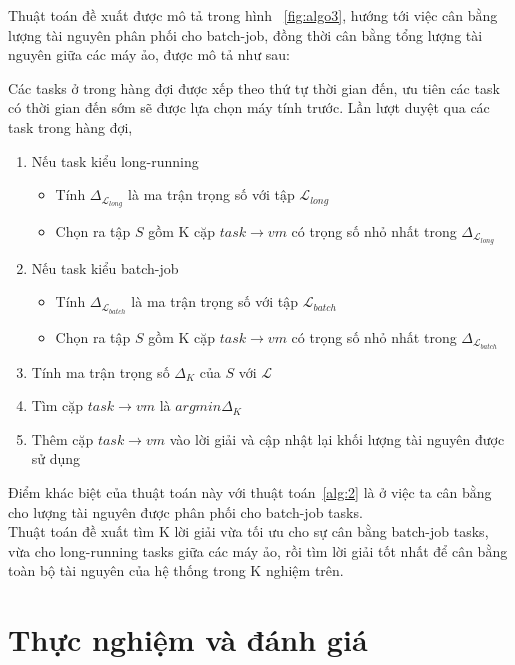 \documentclass{my_style}
\begin{document}
Thuật toán đề xuất được mô tả trong hình ~\ref{fig:algo3}, hướng tới việc cân bằng lượng tài nguyên phân phối cho batch-job, đồng thời cân bằng tổng lượng tài nguyên giữa các máy ảo, được mô tả như sau: \par
Các tasks ở trong hàng đợi được xếp theo thứ tự thời gian đến, ưu tiên các task có thời gian đến sớm sẽ được lựa chọn máy tính trước. Lần lượt duyệt qua các task trong hàng đợi, 
\begin{enumerate}
	\item Nếu task kiểu long-running	
		\begin{itemize}
			\item Tính $\Delta_{\mathcal{L}_{long}}$ là ma trận trọng số với tập $\mathcal{L}_{long}$
			\item Chọn ra tập $S$ gồm K cặp $task \rightarrow vm$ có trọng số nhỏ nhất trong $\Delta_{\mathcal{L}_{long}}$
		\end{itemize}
	\item Nếu task kiểu batch-job 
		\begin{itemize}
			\item Tính $\Delta_{\mathcal{L}_{batch}}$ là ma trận trọng số với tập $\mathcal{L}_{batch}$
			\item Chọn ra tập $S$ gồm K cặp $task \rightarrow vm$ có trọng số nhỏ nhất trong $\Delta_{\mathcal{L}_{batch}}$
		\end{itemize}
	\item Tính ma trận trọng số $\Delta_{K}$ của $S$ với $\mathcal{L}$
	\item Tìm cặp $task \rightarrow vm$ là $argmin\Delta_{K}$
	\item Thêm cặp $task \rightarrow vm$ vào lời giải và cập nhật lại khối lượng tài nguyên được sử dụng
\end{enumerate}
Điểm khác biệt của thuật toán này với thuật toán~\ref{alg:2} là ở việc ta cân bằng cho lượng tài nguyên được phân phối cho batch-job tasks.\\
Thuật toán đề xuất tìm K lời giải vừa tối ưu cho sự cân bằng batch-job tasks, vừa cho long-running tasks giữa các máy ảo, rồi tìm lời giải tốt nhất để cân bằng toàn bộ tài nguyên của hệ thống trong K nghiệm trên. 
\newpage 
\chapter{Thực nghiệm và đánh giá}
\label{Experiments}
\end{document}
